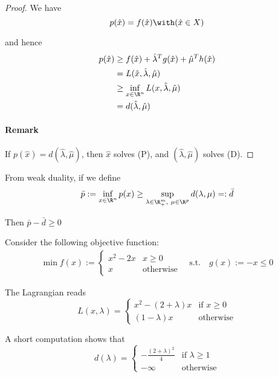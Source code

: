 \begin{proof}
	\def\hx{\hat x}
	\def\hl{\hat\lambda}
	\def\hm{\hat\mu}
	We have
	$$
		p(\hx) = f(\hx)\with(\hx\in X)
	$$

	and hence
	\begin{align*}
		p(\hx) & \geq f(\hx) + \hl^Tg(\hx) + \hm^Th(\hx) \\
		       & =L(\hx,\hl,\hm)                         \\
		       & \geq\inf_{x\in\R^n}L(x,\hl,\hm)         \\
		       & = d(\hl,\hm)
	\end{align*}

	\paragraph{Remark} If $p(\hx)=d(\hl,\hm)$, then $\hx$ solves (P),
	and $(\hl,\hm)$ solves (D).
\end{proof}

From weak duality, if we define
\begin{align*}
	\bar p:=\inf_{x\in\R^n}p(x)\geq
	\sup_{\lambda\in\R^m_+,\ \mu\in\R^p}d(\lambda,\mu)
	=:\bar d
\end{align*}

Then $\bar p-\bar d\geq0$

\label{c4aaa1f}


Consider the following objective function:
\begin{align*}
	\min f(x):=\begin{cases}
		           x^2-2x & x\geq0           \\
		           x      & \text{otherwise}
	           \end{cases}
	\quad \text{s.t.}\quad g(x):=-x\leq0
\end{align*}


The Lagrangian reads
$$
	L(x,\lambda)=\begin{cases}
		x^2-(2+\lambda)x & \text{if } x\geq0 \\
		(1-\lambda)x     & \text{otherwise}
	\end{cases}
$$

A short computation shows that
$$
	d(\lambda)=\begin{cases}
		-\frac{(2+\lambda)^2}{4} & \text{if }\lambda\geq1 \\
		-\infty                  & \text{otherwise}
	\end{cases}
$$

